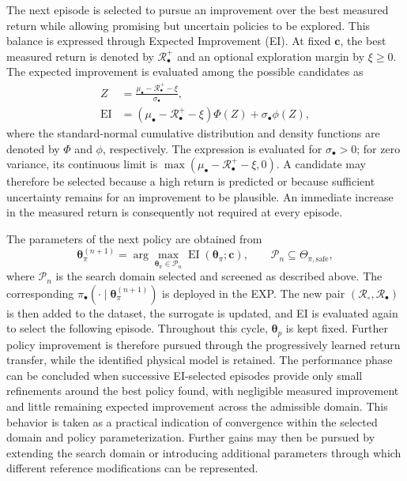 \documentclass[journal]{IEEEtran}
\begin{document}
The next episode is selected to pursue an improvement over the best measured return while allowing promising but uncertain policies to be explored. This balance is expressed through Expected Improvement (EI). At fixed $\mathbf c$, the best measured return is denoted by $\mathcal R_\bullet^+$ and an optional exploration margin by $\xi\geq0$. The expected improvement is evaluated among the possible candidates as
\begin{equation}
 \begin{aligned}
 Z&=\frac{\mu_\bullet-\mathcal R_\bullet^+-\xi}{\sigma_\bullet},\\
 \operatorname{EI}
 &=(\mu_\bullet-\mathcal R_\bullet^+-\xi)\Phi(Z)
   +\sigma_\bullet\phi(Z),
 \end{aligned}
 \label{eq:rt-expected-improvement}
\end{equation}
where the standard-normal cumulative distribution and density functions are denoted by $\Phi$ and $\phi$, respectively. The expression is evaluated for $\sigma_\bullet>0$; for zero variance, its continuous limit is $\max(\mu_\bullet-\mathcal R_\bullet^+-\xi,0)$. A candidate may therefore be selected because a high return is predicted or because sufficient uncertainty remains for an improvement to be plausible. An immediate increase in the measured return is consequently not required at every episode.

The parameters of the next policy are obtained from
\begin{equation}
 \boldsymbol{\theta}_\pi^{(n+1)}
 =\arg\max_{\boldsymbol{\theta}_\pi\in\mathcal P_n}
 \operatorname{EI}(\boldsymbol{\theta}_\pi;\mathbf c),
 \qquad \mathcal P_n\subseteq\Theta_{\pi,\mathrm{safe}},
 \label{eq:rt-next-performance}
\end{equation}
where $\mathcal P_n$ is the search domain selected and screened as described above. The corresponding $\pi_\bullet(\cdot\mid\boldsymbol{\theta}_\pi^{(n+1)})$ is deployed in the EXP. The new pair $(\mathcal R_\circ,\mathcal R_\bullet)$ is then added to the dataset, the surrogate is updated, and EI is evaluated again to select the following episode. Throughout this cycle, $\boldsymbol{\theta}_p$ is kept fixed. Further policy improvement is therefore pursued through the progressively learned return transfer, while the identified physical model is retained.
The performance phase can be concluded when successive EI-selected episodes provide only small refinements around the best policy found, with negligible measured improvement and little remaining expected improvement across the admissible domain. This behavior is taken as a practical indication of convergence within the selected domain and policy parameterization. Further gains may then be pursued by extending the search domain or introducing additional parameters through which different reference modifications can be represented.
\end{document}
